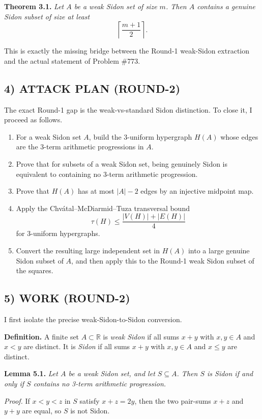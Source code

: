 \medskip
\noindent\textbf{Theorem 3.1.} \emph{Let $A$ be a weak Sidon set of size $m$. Then $A$ contains a genuine Sidon subset of size at least}
\[
\left\lceil \frac{m+1}{2}\right\rceil.
\]

This is exactly the missing bridge between the Round-1 weak-Sidon extraction and the actual statement of Problem \#773.

\subsection*{4) ATTACK PLAN (ROUND-2)}
The exact Round-1 gap is the weak-vs-standard Sidon distinction. To close it, I proceed as follows.

\begin{enumerate}
\item For a weak Sidon set $A$, build the 3-uniform hypergraph $H(A)$ whose edges are the 3-term arithmetic progressions in $A$.
\item Prove that for subsets of a weak Sidon set, being genuinely Sidon is equivalent to containing no 3-term arithmetic progression.
\item Prove that $H(A)$ has at most $|A|-2$ edges by an injective midpoint map.
\item Apply the Chv\'atal--McDiarmid--Tuza transversal bound
\[
\tau(H) \le \frac{|V(H)|+|E(H)|}{4}
\]
for 3-uniform hypergraphs.
\item Convert the resulting large independent set in $H(A)$ into a large genuine Sidon subset of $A$, and then apply this to the Round-1 weak Sidon subset of the squares.
\end{enumerate}

\subsection*{5) WORK (ROUND-2)}
I first isolate the precise weak-Sidon-to-Sidon conversion.

\medskip
\noindent\textbf{Definition.} A finite set $A\subset\mathbb R$ is \emph{weak Sidon} if all sums $x+y$ with $x,y\in A$ and $x<y$ are distinct. It is \emph{Sidon} if all sums $x+y$ with $x,y\in A$ and $x\le y$ are distinct.

\medskip
\noindent\textbf{Lemma 5.1.} \emph{Let $A$ be a weak Sidon set, and let $S\subseteq A$. Then $S$ is Sidon if and only if $S$ contains no 3-term arithmetic progression.}

\medskip
\noindent\emph{Proof.} If $x<y<z$ in $S$ satisfy $x+z=2y$, then the two pair-sums $x+z$ and $y+y$ are equal, so $S$ is not Sidon.

